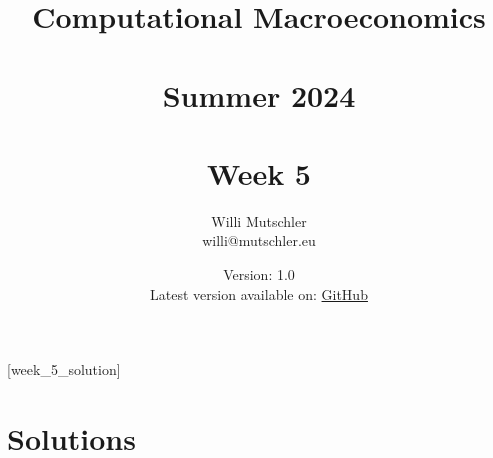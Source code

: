 
\newif\ifDisplaySolutions\DisplaySolutionstrue%


\title{Computational Macroeconomics\\~\\Summer 2024\\~\\Week 5}
\author{Willi Mutschler\\willi@mutschler.eu}
\date{Version: 1.0\\Latest version available on: \href{https://github.com/wmutschl/Computational-Macroeconomics/releases/latest/download/week_5.pdf}{GitHub}}
\maketitle\thispagestyle{empty}

\newpage
{}[week_5_solution]
\tableofcontents\thispagestyle{empty}\newpage

\setcounter{page}{1}
\newpage
\newpage

\newpage

\ifDisplaySolutions%
\newpage
\appendix
\section{Solutions}

\fi
